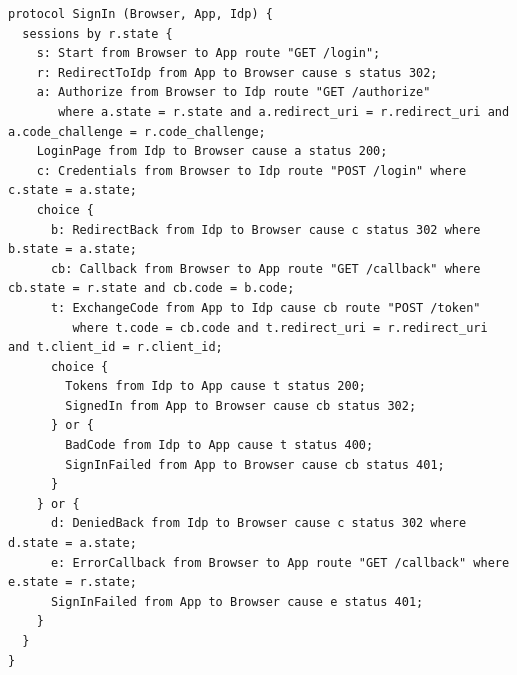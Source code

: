 \begin{lstlisting}[language={},basicstyle=\ttfamily\scriptsize,breaklines=true]
protocol SignIn (Browser, App, Idp) {
  sessions by r.state {
    s: Start from Browser to App route "GET /login";
    r: RedirectToIdp from App to Browser cause s status 302;
    a: Authorize from Browser to Idp route "GET /authorize"
       where a.state = r.state and a.redirect_uri = r.redirect_uri and a.code_challenge = r.code_challenge;
    LoginPage from Idp to Browser cause a status 200;
    c: Credentials from Browser to Idp route "POST /login" where c.state = a.state;
    choice {
      b: RedirectBack from Idp to Browser cause c status 302 where b.state = a.state;
      cb: Callback from Browser to App route "GET /callback" where cb.state = r.state and cb.code = b.code;
      t: ExchangeCode from App to Idp cause cb route "POST /token"
         where t.code = cb.code and t.redirect_uri = r.redirect_uri and t.client_id = r.client_id;
      choice {
        Tokens from Idp to App cause t status 200;
        SignedIn from App to Browser cause cb status 302;
      } or {
        BadCode from Idp to App cause t status 400;
        SignInFailed from App to Browser cause cb status 401;
      }
    } or {
      d: DeniedBack from Idp to Browser cause c status 302 where d.state = a.state;
      e: ErrorCallback from Browser to App route "GET /callback" where e.state = r.state;
      SignInFailed from App to Browser cause e status 401;
    }
  }
}
\end{lstlisting}
